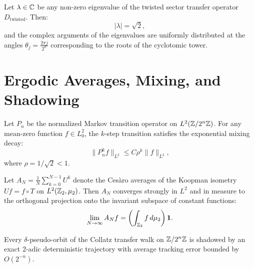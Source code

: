\begin{theorem}
\label{thm:spectral_circle}
\leanok
Let $\lambda \in \mathbb{C}$ be any non-zero eigenvalue of the twisted sector transfer operator $D_{\mathrm{twisted}}$. Then:
\[
|\lambda| = \sqrt{2},
\]
and the complex arguments of the eigenvalues are uniformly distributed at the angles $\theta_j = \frac{2\pi j}{2^n}$ corresponding to the roots of the cyclotomic tower.
\end{theorem}

\section{Ergodic Averages, Mixing, and Shadowing}

\begin{theorem}
\label{thm:l2_mixing}
\leanok
Let $P_n$ be the normalized Markov transition operator on $L^2(\mathbb{Z}/2^n\mathbb{Z})$. For any mean-zero function $f \in L^2_0$, the $k$-step transition satisfies the exponential mixing decay:
\[
\| P_n^k f \|_{L^2} \le C \rho^k \| f \|_{L^2},
\]
where $\rho = 1 / \sqrt{2} < 1$.
\end{theorem}

\begin{theorem}
\label{thm:mean_ergodic}
Let $A_N = \frac{1}{N} \sum_{k=0}^{N-1} U^k$ denote the Ces\`aro averages of the Koopman isometry $U f = f \circ T$ on $L^2(\mathbb{Z}_2, \mu_2)$. Then $A_N$ converges strongly in $L^2$ and in measure to the orthogonal projection onto the invariant subspace of constant functions:
\[
\lim_{N \to \infty} A_N f = \left(\int_{\mathbb{Z}_2} f \, d\mu_2\right) \mathbf{1}.
\]
\end{theorem}

\begin{theorem}
\label{thm:orbit_shadowing}
\leanok
Every $\delta$-pseudo-orbit of the Collatz transfer walk on $\mathbb{Z}/2^n\mathbb{Z}$ is shadowed by an exact 2-adic deterministic trajectory with average tracking error bounded by $O(2^{-n})$.
\end{theorem}

